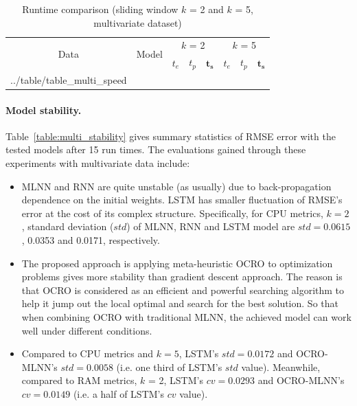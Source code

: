 \documentclass[11pt,twoside]{article}
\makeatletter
\newcommand\primitiveinput[1]
		{\@@input #1 }
\makeatother
\begin{document}
\begin{multicols}{2}
\begin{table}[!t]
	\caption{Runtime comparison (sliding window $k$ = 2 and $k$ = 5, multivariate dataset)}
	\label{table:multi_speed}
	\centering
		\begin{tabular}{| c | c | c | c | c | c | c | c |}%
			\hline
			\multirow{2}{*}{Data} & \multirow{2}{*}{Model} & \multicolumn{3}{c|}{$k$ = 2} & \multicolumn{3}{c|}{ $k$ = 5 } \\ \cline{3-8}
   				& & $t_e$ & $t_p$ & $\boldsymbol{t_s}$ & $t_e$ & $t_p$ & $\boldsymbol{t_s}$  \\ [0.5ex] \hline
			\primitiveinput{../table/table_multi_speed}
			\hline
		\end{tabular}
\end{table}

\paragraph{\textbf{Model stability.}} Table~\ref{table:multi_stability} gives summary statistics of RMSE error with the tested models after 15 run times. The evaluations gained through these experiments with multivariate data include:
\begin{itemize}
	\item MLNN and RNN are quite unstable (as usually) due to back-propagation dependence on the initial weights. LSTM has smaller fluctuation of RMSE's error at the cost of its complex structure. Specifically, for CPU metrics, $k = 2$, standard deviation ($std$) of MLNN, RNN and LSTM model are $std = 0.0615$, 0.0353 and 0.0171, respectively. 
	\item The proposed approach is applying meta-heuristic OCRO to optimization problems gives more stability than gradient descent approach. The reason is that OCRO is considered as an efficient and powerful searching algorithm to help it jump out the local optimal and search for the best solution. So that when combining OCRO with traditional MLNN, the achieved model can work well under different conditions. 
	\item Compared to CPU metrics and $k = 5$, LSTM's $std = 0.0172$ and OCRO-MLNN's $std= 0.0058$ (i.e. one third of LSTM's $std$ value). Meanwhile, compared to RAM metrics, $k$ = 2, LSTM's $cv = 0.0293$ and OCRO-MLNN's $cv=0.0149$ (i.e. a half of LSTM's $cv$ value). 
\end{itemize}


\end{multicols}
\end{document}
